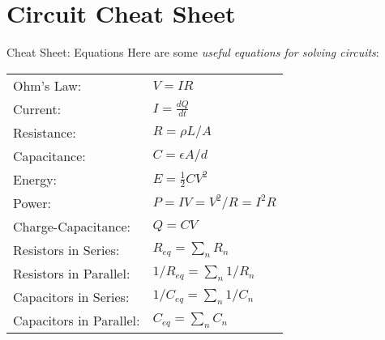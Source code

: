\section{Circuit Cheat Sheet}

\begin{frame}{Cheat Sheet: Equations}
    Here are some \textit{useful equations for solving circuits}:\\[1ex]
    \small{
        \begin{tabular}{l l}
            Ohm's Law: & $V = IR$ \\
            Current: & $I = \frac{dQ}{dt}$ \\
            Resistance: & $R = \rho L/A$ \\
            Capacitance: & $C = \epsilon A/d$ \\
            Energy: & $E = \frac{1}{2} CV^2$ \\
            Power: & $P = IV = V^2/R = I^2R$ \\
            Charge-Capacitance: & $Q = CV$ \\
            Resistors in Series: & $R_{eq} = \sum_n R_n$ \\
            Resistors in Parallel: & $1/R_{eq} = \sum_n 1/R_n$ \\
            Capacitors in Series: & $1/C_{eq} = \sum_n 1/C_n$ \\
            Capacitors in Parallel: & $C_{eq} = \sum_n C_n$
        \end{tabular}
    }
\end{frame}

